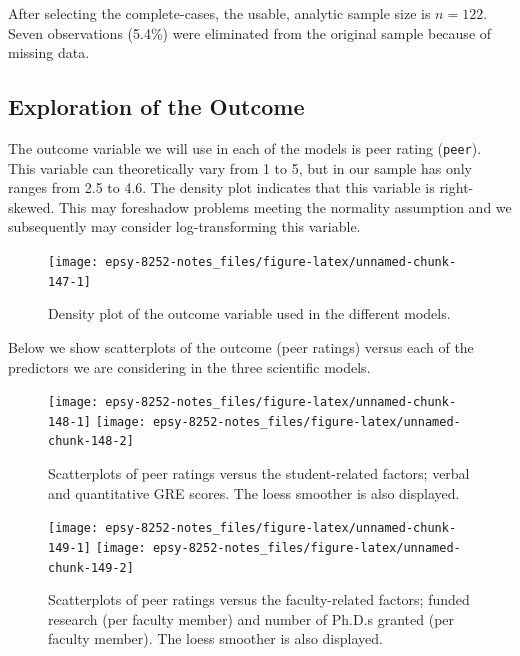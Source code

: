 \documentclass[]{book}
\begin{document}
After selecting the complete-cases, the usable, analytic sample size is \(n=122\). Seven observations (5.4\%) were eliminated from the original sample because of missing data.

\hypertarget{exploration-of-the-outcome}{%
\subsection{Exploration of the Outcome}\label{exploration-of-the-outcome}}

The outcome variable we will use in each of the models is peer rating (\texttt{peer}). This variable can theoretically vary from 1 to 5, but in our sample has only ranges from 2.5 to 4.6. The density plot indicates that this variable is right-skewed. This may foreshadow problems meeting the normality assumption and we subsequently may consider log-transforming this variable.

\begin{figure}

{\centering \texttt{[image: epsy-8252-notes\_files/figure-latex/unnamed-chunk-147-1]} 

}

\caption{Density plot of the outcome variable used in the different models.}\label{fig:unnamed-chunk-147}
\end{figure}

Below we show scatterplots of the outcome (peer ratings) versus each of the predictors we are considering in the three scientific models.

\begin{figure}

{\centering \texttt{[image: epsy-8252-notes\_files/figure-latex/unnamed-chunk-148-1]} \texttt{[image: epsy-8252-notes\_files/figure-latex/unnamed-chunk-148-2]} 

}

\caption{Scatterplots of peer ratings versus the student-related factors; verbal and quantitative GRE scores. The loess smoother is also displayed.}\label{fig:unnamed-chunk-148}
\end{figure}

\begin{figure}

{\centering \texttt{[image: epsy-8252-notes\_files/figure-latex/unnamed-chunk-149-1]} \texttt{[image: epsy-8252-notes\_files/figure-latex/unnamed-chunk-149-2]} 

}

\caption{Scatterplots of peer ratings versus the faculty-related factors; funded research (per faculty member) and number of Ph.D.s granted (per faculty member). The loess smoother is also displayed.}\label{fig:unnamed-chunk-149}
\end{figure}
\end{document}
